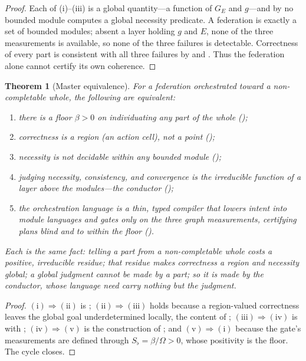 \documentclass[twocolumn,11pt,a4paper]{article}
\theoremstyle{sup}
\newtheorem{theorem}{Theorem}[section]
\theoremstyle{definition}
\theoremstyle{remark}
\newcommand{\flo}{\beta}              %
\newcommand{\Om}{\Omega}
\newcommand{\Sflat}{S_{\flat}}        %
\newcommand{\Ens}{E}                  %
\begin{document}
\begin{proof}
Each of (i)--(iii) is a global quantity---a function of $G_\Ens$ and $g$---and by
 no bounded module computes a global necessity
predicate. A federation is exactly a set of bounded modules; absent a layer
holding $g$ and $\Ens$, none of the three measurements is available, so none of
the three failures is detectable. Correctness of every part is consistent with all
three failures by  and . Thus the
federation alone cannot certify its own coherence.
\end{proof}

\begin{theorem}[Master equivalence]
\label{thm:master}
For a federation orchestrated toward a non-completable whole, the following are
equivalent:
\begin{enumerate}[label=\textup{(\roman*)},leftmargin=2em,itemsep=1pt]
\item there is a floor $\flo>0$ on individuating any part of the whole
();
\item correctness is a region (an action cell), not a point
();
\item necessity is not decidable within any bounded module
();
\item judging necessity, consistency, and convergence is the irreducible function
of a layer above the modules---the conductor ();
\item the orchestration language is a thin, typed compiler that lowers intent into
module languages and gates only on the three graph measurements, certifying plans
blind and to within the floor
().
\end{enumerate}
Each is the same fact: telling a part from a non-completable whole costs a
positive, irreducible residue; that residue makes correctness a region and
necessity global; a global judgment cannot be made by a part; so it is made by the
conductor, whose language need carry nothing but the judgment.
\end{theorem}

\begin{proof}
$(\mathrm i)\!\Rightarrow\!(\mathrm{ii})$ is ;
$(\mathrm{ii})\!\Rightarrow\!(\mathrm{iii})$ holds because a region-valued
correctness leaves the global goal underdetermined locally, the content of
; $(\mathrm{iii})\!\Rightarrow\!(\mathrm{iv})$ is
 with ;
$(\mathrm{iv})\!\Rightarrow\!(\mathrm v)$ is the construction of
; and $(\mathrm v)\!\Rightarrow\!(\mathrm i)$ because
the gate's measurements are defined through $\Sflat=\flo/\Om>0$, whose positivity
is the floor. The cycle closes.
\end{proof}
\end{document}
